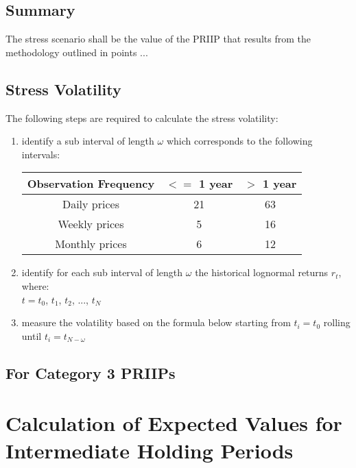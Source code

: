\subsection{Summary}
The stress scenario shall be the value of the PRIIP that results from the methodology outlined in points ...\\

\subsection{Stress Volatility}
The following steps are required to calculate the stress volatility:
\begin{enumerate}
	\item identify a sub interval of length $\omega$ which corresponds to the following intervals:
	\begin{center}
		\begin{longtable}{| c | c | c|}
			\hline
			\textbf{Observation Frequency} & $<=$\textbf{ 1 year} & $> $ \textbf{ 1 year}\\
			\hline
			Daily prices & 21 & 63\\
			\hline
			Weekly prices & 5 & 16\\
			\hline
			Monthly prices & 6 & 12\\
			\hline
		\end{longtable}
	\end{center}
	\item identify for each sub interval of length $\omega$ the historical lognormal returns $r_{t}$,\\
	where:\\
	$t = t_{0}$, $t_{1}$, $t_{2}$, ..., $t_{N}$ 
	\item measure the volatility based on the formula below starting from $t_{i} = t_{0}$ rolling until $t_{i} = t_{N - \omega}$
\end{enumerate}

\subsection{For Category 3 PRIIPs}
\label{Sec:StressScenarioForCategory3}

\section{Calculation of Expected Values for Intermediate Holding Periods}

